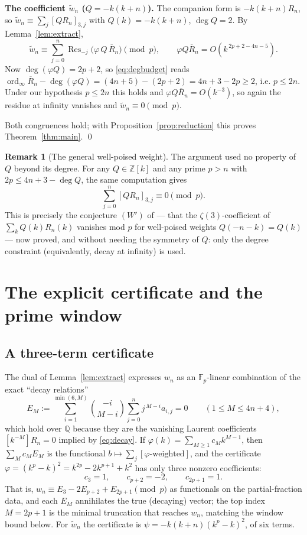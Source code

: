 \documentclass[11pt]{article}
\theoremstyle{definition}
\newtheorem{remark}[theorem]{Remark}
\DeclareMathOperator{\ord}{ord}
\DeclareMathOperator{\Res}{Res}
\newcommand{\Fp}{\mathbb{F}_p}
\newcommand{\Z}{\mathbb{Z}}
\newcommand{\Q}{\mathbb{Q}}
\newcommand{\zt}[1]{\zeta(#1)}
\newcommand{\wt}{\widetilde}
\begin{document}
\medskip
\noindent\textbf{The coefficient $\wt w_n$ ($Q=-k(k+n)$).}
The companion form is $-k(k+n)R_n$, so $\wt w_n\equiv\sum_j[QR_n]_{3,j}$ with
$Q(k)=-k(k+n)$, $\deg Q=2$. By Lemma~\ref{lem:extract},
\[
\wt w_n\equiv\sum_{j=0}^n\Res_{-j}\bigl(\varphi\,Q\,\overline R_n\bigr)\pmod p ,
\qquad
\varphi Q\overline R_n=O\!\left(k^{\,2p+2-4n-5}\right).
\]
Now $\deg(\varphi Q)=2p+2$, so \eqref{eq:degbudget} reads
$\ord_\infty\overline R_n-\deg(\varphi Q)=(4n+5)-(2p+2)=4n+3-2p\ge2$, i.e.
$p\le2n$. Under our hypothesis $p\le2n$ this holds and
$\varphi Q\overline R_n=O(k^{-3})$, so again the residue at infinity vanishes
and $\wt w_n\equiv0\pmod p$.

\medskip
Both congruences hold; with Proposition~\ref{prop:reduction} this proves
Theorem~\ref{thm:main}. \qed

\begin{remark}[The general well-poised weight]
The argument used no property of $Q$ beyond its degree. For any $Q\in\Z[k]$ and
any prime $p>n$ with $2p\le 4n+3-\deg Q$, the same computation gives
\[
\sum_{j=0}^{n}[QR_n]_{3,j}\equiv0\pmod p .
\]
This is precisely the conjecture $(W')$ of \cite[\S2]{LemmaCB} — that the
$\zt3$-coefficient of $\sum_k Q(k)R_n(k)$ vanishes mod $p$ for well-poised
weights $Q(-n-k)=Q(k)$ — now proved, and without needing the symmetry of $Q$:
only the degree constraint (equivalently, decay at infinity) is used.
\end{remark}

\section{The explicit certificate and the prime window}\label{sec:remarks}

\subsection*{A three-term certificate}
The dual of Lemma~\ref{lem:extract} expresses $w_n$ as an $\Fp$-linear
combination of the exact ``decay relations''
\[
E_M:=\sum_{i=1}^{\min(6,M)}\binom{-i}{M-i}\sum_{j=0}^n j^{\,M-i}a_{i,j}=0
\qquad(1\le M\le 4n+4),
\]
which hold over $\Q$ because they are the vanishing Laurent coefficients
$[k^{-M}]R_n=0$ implied by \eqref{eq:decay}. If $\varphi(k)=\sum_{M\ge1}c_M
k^{M-1}$, then $\sum_M c_M E_M$ is the functional $b\mapsto\sum_j[\text{$\varphi$-weighted}]$,
and the certificate $\varphi=(k^p-k)^2=k^{2p}-2k^{p+1}+k^2$ has only three
nonzero coefficients:
\begin{equation}\label{eq:threeterm}
c_3=1,\qquad c_{p+2}=-2,\qquad c_{2p+1}=1 .
\end{equation}
That is, $w_n\equiv E_3-2E_{p+2}+E_{2p+1}\pmod p$ as functionals on the
partial-fraction data, and each $E_M$ annihilates the true (decaying) vector; the
top index $M=2p+1$ is the minimal truncation that reaches $w_n$, matching the
window bound below. For $\wt w_n$ the certificate is
$\psi=-k(k+n)(k^p-k)^2$, of six terms.
\end{document}
